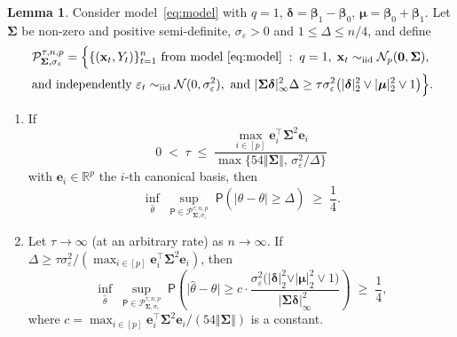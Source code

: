 \documentclass[11pt, a4paper]{article}
\newcommand{\mbf}{\mathbf}
\newcommand{\mc}{\mathcal}
\newcommand{\vep}{\varepsilon}
\renewcommand{\l}{\left}
\renewcommand{\r}{\right}
\def\wh{\widehat}
\newcommand{\p}{\mathsf{P}}
\newcommand{\R}{\mathbb{R}}
\newcommand{\iid}{\text{\upshape iid}}
\theoremstyle{definition}
\theoremstyle{definition}
\theoremstyle{definition}
\newtheorem{lem}[thm]{Lemma}
\theoremstyle{definition}
\theoremstyle{definition}
\theoremstyle{remark}
\theoremstyle{definition}
\theoremstyle{definition}
\theoremstyle{definition}
\begin{document}
\begin{lem}
\label{lem:lb}
Consider model~\eqref{eq:model} with $q = 1$, $\bm\delta = \bm\beta_1 - \bm\beta_0$, $\bm\mu = \bm\beta_0 + \bm\beta_1$.
Let $\bm \Sigma$ be non-zero and positive semi-definite, $\sigma_{\vep}>0$ and $1 \le \Delta \le n/4$, and define
\begin{multline*}
\mc P_{\bm\Sigma, \sigma_{\vep}}^{\tau, n, p} = \Bigl\{ \{(\mbf x_t, Y_t)\}_{t = 1}^n \text{ from model~\eqref{eq:model}} \;:\; q = 1,\;\mbf x_t \sim_{\iid} \mc N_p(\bm0, \bm \Sigma), \\
\text{ and independently }\vep_t \sim_{\iid}\mc N (0,\sigma_{\vep}^2), \text{ and } \vert\bm\Sigma \bm\delta\vert_{\infty}^2 \Delta \ge \tau \sigma_{\vep}^2\bigl(\vert\bm\delta\vert_2^2 \vee \vert \bm\mu\vert_2^2  \vee 1\bigr)\Bigr\}.   
\end{multline*}

\begin{enumerate}[label = (\roman*)]
\item\label{lem:lb:detect}
If  
\[
0 \;< \;\tau \;\le\; \frac{\max_{i \in [p]}\bm e_i^\top \bm\Sigma^2 \bm e_i}{\max\{54\Vert\bm\Sigma\Vert, \, \sigma_{\vep}^2/\Delta\}}
\] 
with $\bm e_i \in \R^p$ the $i$-th canonical basis, then
$$
\inf_{\wh\theta}\; \sup_{\p \in \mc P_{\bm\Sigma, \sigma_{\vep}}^{\tau, n, p}} \;\p\l(\bigl\vert\wh\theta -\theta\bigr\vert \ge \Delta\r)\; \ge\; \frac{1}{4}.
$$    
\item \label{lem:lb:locate}
Let $\tau \to \infty$ (at an arbitrary rate) as $n\to \infty$. If $\Delta \ge \tau\sigma_{\vep}^2 / (\max_{i \in [p]}\bm e_i^\top \bm\Sigma^2 \bm e_i)$, then
$$
\inf_{\wh\theta}\; \sup_{\p \in \mc P_{\bm\Sigma, \sigma_{\vep}}^{\tau, n, p}} \;\p\l(\bigl\vert\wh\theta -\theta\bigr\vert \ge c\cdot\frac{\sigma_{\vep}^2\bigl(\vert\bm\delta\vert_2^2 \vee \vert \bm\mu\vert_2^2  \vee 1\bigr)}{\vert\bm\Sigma\bm\delta\vert_{\infty}^2}\r)\; \ge\; \frac{1}{4},
$$
where $c = \max_{i \in [p]}\bm e_i^\top \bm\Sigma^2 \bm e_i/(54\Vert\bm\Sigma\Vert)$ is a constant.
\end{enumerate}
\end{lem}
\end{document}
